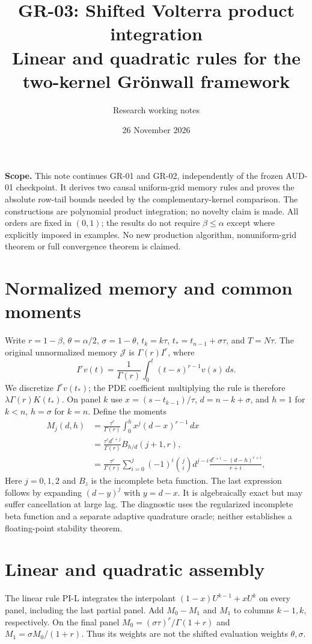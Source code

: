 \documentclass[11pt,a4paper]{article}
\title{GR-03: Shifted Volterra product integration\\\large Linear and quadratic rules for the two-kernel Gr\"onwall framework}
\author{Research working notes}
\date{26 November 2026}
\begin{document}
\maketitle
\noindent\textbf{Scope.} This note continues GR-01 and GR-02, independently of the frozen AUD-01 checkpoint. It derives two causal uniform-grid memory rules and proves the absolute row-tail bounds needed by the complementary-kernel comparison. The constructions are polynomial product integration; no novelty claim is made. All orders are fixed in $(0,1)$; the results do not require $\beta\le\alpha$ except where explicitly imposed in examples. No new production algorithm, nonuniform-grid theorem or full convergence theorem is claimed.
\section{Normalized memory and common moments}
Write $r=1-\beta$, $\theta=\alpha/2$, $\sigma=1-\theta$, $t_k=k\tau$, $t_*=t_{n-1}+\sigma\tau$, and $T=N\tau$. The original unnormalized memory $\mathcal J$ is $\Gamma(r)I^r$, where
\[
 I^r v(t)=\frac1{\Gamma(r)}\int_0^t(t-s)^{r-1}v(s)\,ds.
\]
We discretize $I^r v(t_*)$; the PDE coefficient multiplying the rule is therefore $\lambda\Gamma(r)K(t_*)$. On panel $k$ use $x=(s-t_{k-1})/\tau$, $d=n-k+\sigma$, and $h=1$ for $k<n$, $h=\sigma$ for $k=n$. Define the moments
\begin{align*}
 M_j(d,h)&=\frac{\tau^r}{\Gamma(r)}\int_0^h x^j(d-x)^{r-1}\,dx\\
 &=\frac{\tau^rd^{r+j}}{\Gamma(r)}B_{h/d}(j+1,r),\\
 &=\frac{\tau^r}{\Gamma(r)}\sum_{i=0}^j(-1)^i\binom ji d^{j-i}
       \frac{d^{r+i}-(d-h)^{r+i}}{r+i},
\end{align*}
Here $j=0,1,2$ and $B_z$ is the incomplete beta function. The last expression follows by expanding $(d-y)^j$ with $y=d-x$. It is algebraically exact but may suffer cancellation at large lag. The diagnostic uses the regularized incomplete beta function and a separate adaptive quadrature oracle; neither establishes a floating-point stability theorem.
\section{Linear and quadratic assembly}
The linear rule PI-L integrates the interpolant $(1-x)U^{k-1}+xU^k$ on every panel, including the last partial panel. Add $M_0-M_1$ and $M_1$ to columns $k-1,k$, respectively. On the final panel $M_0=(\sigma\tau)^r/\Gamma(1+r)$ and $M_1=\sigma M_0/(1+r)$. Thus its weights are not the shifted evaluation weights $\theta,\sigma$.
\end{document}
